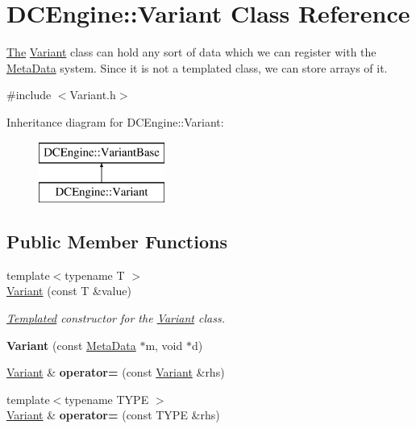 \hypertarget{classDCEngine_1_1Variant}{\section{D\-C\-Engine\-:\-:Variant Class Reference}
\label{classDCEngine_1_1Variant}
}


\hyperlink{classThe}{The} \hyperlink{classDCEngine_1_1Variant}{Variant} class can hold any sort of data which we can register with the \hyperlink{classDCEngine_1_1MetaData}{Meta\-Data} system. Since it is not a templated class, we can store arrays of it.  




{\ttfamily \#include $<$Variant.\-h$>$}

Inheritance diagram for D\-C\-Engine\-:\-:Variant\-:\begin{figure}[H]
\begin{center}
\leavevmode
\includegraphics[height=2.000000cm]{classDCEngine_1_1Variant}
\end{center}
\end{figure}
\subsection*{Public Member Functions}
\begin{DoxyCompactItemize}
\item 
{\footnotesize template$<$typename T $>$ }\\\hyperlink{classDCEngine_1_1Variant_a87ffaf324e0d7b0418c934731de51791}{Variant} (const T \&value)
\begin{DoxyCompactList}\small\item\em \hyperlink{classTemplated}{Templated} constructor for the \hyperlink{classDCEngine_1_1Variant}{Variant} class. \end{DoxyCompactList}\item 
\hypertarget{classDCEngine_1_1Variant_a592842ccd2cef9c3885a0905bcfe3887}{{\bfseries Variant} (const \hyperlink{classDCEngine_1_1MetaData}{Meta\-Data} $\ast$m, void $\ast$d)}\label{classDCEngine_1_1Variant_a592842ccd2cef9c3885a0905bcfe3887}

\item 
\hypertarget{classDCEngine_1_1Variant_aac6958fb7e400bcd225f1b9fa7664583}{\hyperlink{classDCEngine_1_1Variant}{Variant} \& {\bfseries operator=} (const \hyperlink{classDCEngine_1_1Variant}{Variant} \&rhs)}\label{classDCEngine_1_1Variant_aac6958fb7e400bcd225f1b9fa7664583}

\item 
\hypertarget{classDCEngine_1_1Variant_a1f331204af30576d7f618716b69db8a1}{{\footnotesize template$<$typename T\-Y\-P\-E $>$ }\\\hyperlink{classDCEngine_1_1Variant}{Variant} \& {\bfseries operator=} (const T\-Y\-P\-E \&rhs)}\label{classDCEngine_1_1Variant_a1f331204af30576d7f618716b69db8a1}

\end{DoxyCompactItemize}

